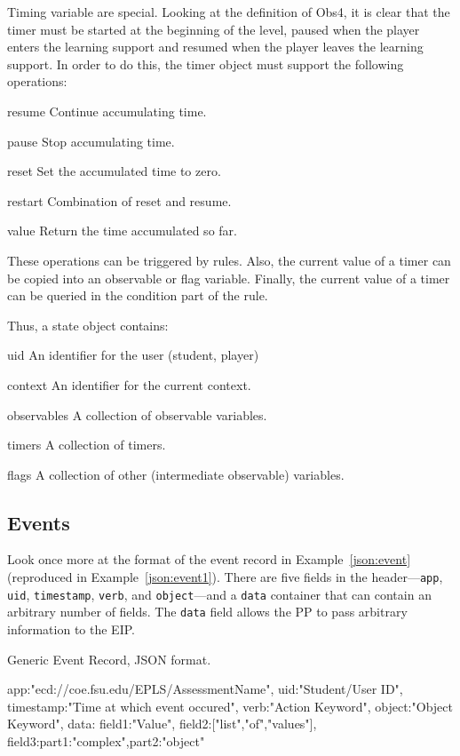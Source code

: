 \documentclass{article}
\begin{document}
  Timing variable are special.  Looking at the definition of Obs4, it
  is clear that the timer must be started at the beginning of the
  level, paused when the player enters the learning support and resumed
  when the player leaves the learning support.  In order to do this,
  the timer object must support the following operations:
  \begin{describe}
  \item[resume]{Continue accumulating time.}
  \item[pause]{Stop accumulating time.}
  \item[reset]{Set the accumulated time to zero.}
  \item[restart]{Combination of reset and resume.}
  \item[value]{Return the time accumulated so far.}
  \end{describe}

  These operations can be triggered by rules.  Also, the current value
  of a timer can be copied into an observable or flag variable.
  Finally, the current value of a timer can be queried in the
  condition part of the rule.

  Thus, a state object contains:
  \begin{describe}
  \item[uid]{An identifier for the user (student, player)}
  \item[context]{An identifier for the current context.}
  \item[observables]{A collection of observable variables.}
  \item[timers]{A collection of timers.}
  \item[flags]{A collection of other (intermediate observable)
    variables.}
  \end{describe}
  

  \subsection{Events}
  \label{sub:events}

  Look once more at the format of the event record in
  Example~\ref{json:event} (reproduced in Example~\ref{json:event1}).
  There are five fields in the header---\texttt{app}, \texttt{uid},
  \texttt{timestamp}, \texttt{verb}, and \texttt{object}---and a
  \texttt{data} container that can contain an arbitrary number of
  fields.  The \texttt{data} field allows the PP to pass arbitrary
  information to the EIP.

  \begin{algorithm}
    \caption{Generic Event Record, JSON format.}
    \label{json:event1}
    \begin{listing}
      {
        app:"ecd://coe.fsu.edu/EPLS/AssessmentName",
        uid:"Student/User ID",
        timestamp:"Time at which event occured",
        verb:"Action Keyword",
        object:"Object Keyword",
        data:{
          field1:"Value",
          field2:["list","of","values"],
          field3:{part1:"complex",part2:"object"}
        }
      }
  \end{listing}
  \end{algorithm}
\end{document}
